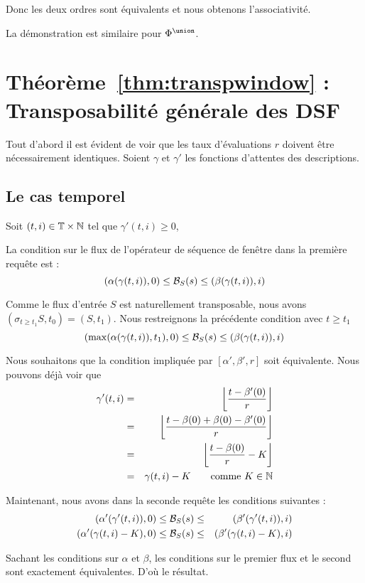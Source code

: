 Donc les deux ordres sont équivalents et nous obtenons l'associativité.

La démonstration est similaire pour $\Phi^\union$.

\section{Théorème~\ref{thm:transpwindow} : Transposabilité générale des DSF}
Tout d'abord il est évident de voir que les taux d'évaluations $r$ doivent être nécessairement identiques. Soient $\gamma$ et $\gamma'$ les fonctions d'attentes des descriptions.
\subsection{Le cas temporel}
Soit $(t,i)\in \mathbb{T}\times\mathbb{N}$ tel que $\gamma'(t,i)\geq 0$,

La condition sur le flux de l'opérateur de séquence de fenêtre dans la première requête est :
$$(\alpha(\gamma(t,i)),0) \leq \mathcal{B}_S(s) \leq (\beta(\gamma(t,i)),i)$$

Comme le flux d'entrée $S$ est naturellement transposable, nous avons $(\sigma_{t\geq t_1} S,t_0) = (S,t_1)$. Nous restreignons la précédente condition avec $t\geq t_1$
$$(\max(\alpha(\gamma(t,i)),t_1),0) \leq \mathcal{B}_S(s) \leq (\beta(\gamma(t,i)),i)$$

Nous souhaitons que la condition impliquée par $[\alpha',\beta',r]$ soit équivalente. Nous pouvons déjà voir que 
\begin{eqnarray*}
\gamma'(t,i) &=& \left\lfloor\frac{t-\beta'(0)}{r}\right\rfloor \\
& = & \left\lfloor\frac{t-\beta(0)+\beta(0)-\beta'(0)}{r}\right\rfloor\\
& = & \left\lfloor\frac{t-\beta(0)}{r} - K\right\rfloor\\
& = & \gamma(t,i) - K\qquad \textrm{comme\ } K \in \mathbb{N}
\end{eqnarray*}

Maintenant, nous avons dans la seconde requête les conditions suivantes :
\begin{eqnarray*}
(\alpha'(\gamma'(t,i)),0) & \leq \mathcal{B}_S(s) \leq & (\beta'(\gamma'(t,i)),i)\\
(\alpha'(\gamma(t,i)-K),0) & \leq \mathcal{B}_S(s) \leq & (\beta'(\gamma(t,i)-K),i)
\end{eqnarray*}

Sachant les conditions sur $\alpha$ et $\beta$, les conditions sur le premier flux et le second sont exactement équivalentes. D'où le résultat.
\findemo

